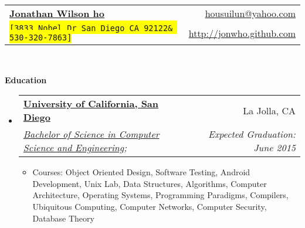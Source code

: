 \documentclass[letterpaper,11pt]{article}
\makeatletter
\newcommand{\resitem}[1]{\item #1 \vspace{-2pt}}
\newcommand{\resheading}[1]{{\large \colorbox{mygrey}{\begin{minipage}{\textwidth}{\textbf{#1 \vphantom{p\^{E}}}}\end{minipage}}}}
\newcommand{\ressubheading}[4]{
\begin{tabular*}{6.5in}{l@{\extracolsep{\fill}}r}
		\textbf{#1} & #2 \\
		\textit{#3} & \textit{#4} \\
\end{tabular*}\vspace{-6pt}}
\makeatother
\begin{document}
\newcommand{\mywebheader}{
\begin{tabular*}{7in}{l@{\extracolsep{\fill}}r}
	\textbf{\href{http://jonwho.github.com}{\LARGE Jonathan Wilson ho}} &
	\href{mailto:housuilun@yahoo.com}{housuilun@yahoo.com}\\
	{\footnotesize \texttt{\colorbox{yellow}{[3833 Nobel Dr San Diego CA 92122\&
						530-320-7863]}}} &
	\href{http://jonwho.github.com}{http://jonwho.github.com} \\
	\end{tabular*}
\\
\vspace{0.1in}}

\mywebheader

\resheading{Education}
  \begin{itemize}
    \item
    \ressubheading{\href{http://www.ucsd.edu}{University of California, San Diego}}{La Jolla, CA}{\href{http://www.cse.ucsd.edu}{Bachelor of Science in Computer Science and Engineering};}{Expected Graduation: June 2015}
    { \footnotesize
      \begin{itemize}
        \resitem{Courses: Object Oriented Design, Software Testing, Android Development, Unix Lab, Data Structures, Algorithms, Computer Architecture, Operating Systems, Programming Paradigms, Compilers, Ubiquitous Computing, Computer Networks, Computer Security, Database Theory}
      \end{itemize}
    }
  \end{itemize} %
\end{document}
